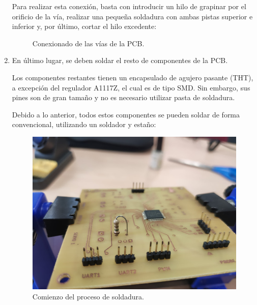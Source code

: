 \begin{enumerate}
    Para realizar esta conexión, basta con introducir un hilo de grapinar por el orificio de la vía, realizar una pequeña soldadura con ambas pistas superior e inferior y, por último, cortar el hilo excedente:
    

    \begin{figure}[H]
    \centering
    \caption{Conexionado de las vías de la \ac{PCB}.}
    \end{figure}
    
    \item En último lugar, se deben soldar el resto de componentes de la \ac{PCB}.
    
    Los componentes restantes tienen un encapsulado de agujero pasante (\ac{THT}), a excepción del regulador A1117Z, el cual es de tipo \ac{SMD}. Sin embargo, sus pines son de gran tamaño y no es necesario utilizar pasta de soldadura.
    
    Debido a lo anterior, todos estos componentes se pueden soldar de forma convencional, utilizando un soldador y estaño:
    
    \begin{figure}[H]
    \centering 
    \includegraphics[width=0.55\linewidth]{pictures/PreSoldado.jpg}
    \caption{Comienzo del proceso de soldadura.}
    \end{figure}
    

\end{enumerate}
